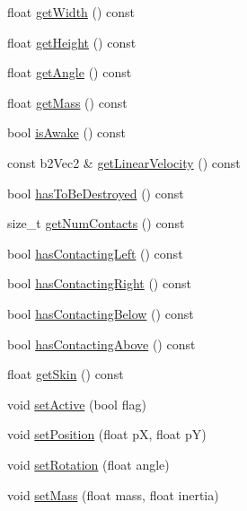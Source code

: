 \begin{DoxyCompactItemize}
\item 
float \hyperlink{class_symp_1_1_physical_entity_afcc95cbf86d08b9fc28522cbf16b5cde}{get\-Width} () const 
\item 
float \hyperlink{class_symp_1_1_physical_entity_a62967222a2cfcb6c89bca1d001eb85f2}{get\-Height} () const 
\item 
float \hyperlink{class_symp_1_1_physical_entity_a03adad775a0c246c4e82f5bac37d5ed5}{get\-Angle} () const 
\item 
float \hyperlink{class_symp_1_1_physical_entity_a8bcefb8b5a7e955acb852238a330d80c}{get\-Mass} () const 
\item 
bool \hyperlink{class_symp_1_1_physical_entity_a2504d426d34310e299e92c38bfb2e86d}{is\-Awake} () const 
\item 
const b2\-Vec2 \& \hyperlink{class_symp_1_1_physical_entity_adb03782dcc7158dc688f0abca067caad}{get\-Linear\-Velocity} () const 
\item 
bool \hyperlink{class_symp_1_1_physical_entity_ad0ecfbeb85eb4c0edb33a615f6116e4a}{has\-To\-Be\-Destroyed} () const 
\item 
size\-\_\-t \hyperlink{class_symp_1_1_physical_entity_ab4ed3012f189219babffba4d2f92e170}{get\-Num\-Contacts} () const 
\item 
bool \hyperlink{class_symp_1_1_physical_entity_af289d52a284981ac291651e074a7234d}{has\-Contacting\-Left} () const 
\item 
bool \hyperlink{class_symp_1_1_physical_entity_ad64dd5049a99e465a2abf69aafee579b}{has\-Contacting\-Right} () const 
\item 
bool \hyperlink{class_symp_1_1_physical_entity_a8ef07fb0d94c3b8f259c4c2b06745069}{has\-Contacting\-Below} () const 
\item 
bool \hyperlink{class_symp_1_1_physical_entity_a2550a6e0171a6e83ee1577302a95d887}{has\-Contacting\-Above} () const 
\item 
float \hyperlink{class_symp_1_1_physical_entity_a7d4745fdfc6661c8ae07f043932e4311}{get\-Skin} () const 
\item 
void \hyperlink{class_symp_1_1_physical_entity_a639b41644740d127c644e852f9365d31}{set\-Active} (bool flag)
\item 
void \hyperlink{class_symp_1_1_physical_entity_a65e45cae463f33e2cc122e5401e08593}{set\-Position} (float p\-X, float p\-Y)
\item 
void \hyperlink{class_symp_1_1_physical_entity_ac074b6f16728007050bd73c4979b1d22}{set\-Rotation} (float angle)
\item 
void \hyperlink{class_symp_1_1_physical_entity_a1fe66ee79894d278cda6b6209dff37e7}{set\-Mass} (float mass, float inertia)

\end{DoxyCompactItemize}
